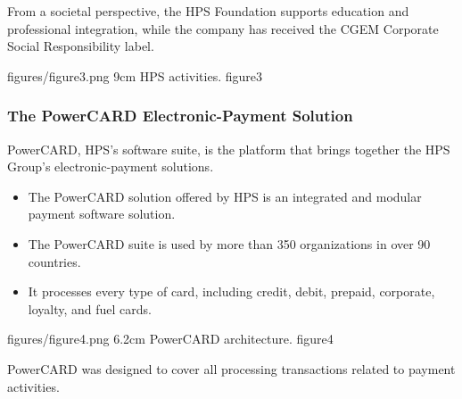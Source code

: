 \documentclass{classeENS}
\begin{document}
From a societal perspective, the HPS Foundation supports education and professional integration, while the company has received the CGEM Corporate Social Responsibility label. %

\insererfigure
{figures/figure3.png}
{9cm}
{HPS activities.}
{figure3}

\subsubsection{The PowerCARD Electronic-Payment Solution}
PowerCARD, HPS's software suite, is the platform that brings together the HPS Group's electronic-payment solutions. %

\begin{itemize}
    \item The PowerCARD solution offered by HPS is an integrated and modular payment software solution. %
    \item The PowerCARD suite is used by more than 350 organizations in over 90 countries. %
    \item It processes every type of card, including credit, debit, prepaid, corporate, loyalty, and fuel cards. %
\end{itemize}

\insererfigure
{figures/figure4.png}
{6.2cm}
{PowerCARD architecture.}
{figure4}

PowerCARD was designed to cover all processing transactions related to payment activities. %
\end{document}
